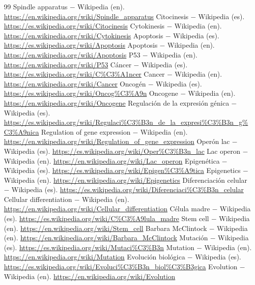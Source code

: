 \documentclass{book}
\begin{document}
\begin{thebibliography}{99}
 Spindle apparatus \(-\) Wikipedia (en). \url{https://en.wikipedia.org/wiki/Spindle_apparatus}
 Citocinesis \(-\) Wikipedia (es). \url{https://es.wikipedia.org/wiki/Citocinesis}
 Cytokinesis \(-\) Wikipedia (en). \url{https://en.wikipedia.org/wiki/Cytokinesis}
 Apoptosis \(-\) Wikipedia (es). \url{https://es.wikipedia.org/wiki/Apoptosis}
 Apoptosis \(-\) Wikipedia (en). \url{https://en.wikipedia.org/wiki/Apoptosis}
 P53 \(-\) Wikipedia (en). \url{https://en.wikipedia.org/wiki/P53}
 Cáncer \(-\) Wikipedia (es). \url{https://es.wikipedia.org/wiki/C%C3%A1ncer}
 Cancer \(-\) Wikipedia (en). \url{https://en.wikipedia.org/wiki/Cancer}
 Oncogén \(-\) Wikipedia (es). \url{https://es.wikipedia.org/wiki/Oncog%C3%A9n}
 Oncogene \(-\) Wikipedia (en). \url{https://en.wikipedia.org/wiki/Oncogene}
 Regulación de la expresión génica \(-\) Wikipedia (es). \url{https://es.wikipedia.org/wiki/Regulaci%C3%B3n_de_la_expresi%C3%B3n_g%C3%A9nica}
 Regulation of gene expression \(-\) Wikipedia (en). \url{https://en.wikipedia.org/wiki/Regulation_of_gene_expression}
 Operón lac \(-\) Wikipedia (es). \url{https://es.wikipedia.org/wiki/Oper%C3%B3n_lac}
 Lac operon \(-\) Wikipedia (en). \url{https://en.wikipedia.org/wiki/Lac_operon}
 Epigenética \(-\) Wikipedia (es). \url{https://es.wikipedia.org/wiki/Epigen%C3%A9tica}
 Epigenetics \(-\) Wikipedia (en). \url{https://en.wikipedia.org/wiki/Epigenetics}
 Diferenciación celular \(-\) Wikipedia (es). \url{https://es.wikipedia.org/wiki/Diferenciaci%C3%B3n_celular}
 Cellular differentiation \(-\) Wikipedia (en). \url{https://en.wikipedia.org/wiki/Cellular_differentiation}
 Célula madre \(-\) Wikipedia (es). \url{https://es.wikipedia.org/wiki/C%C3%A9lula_madre}
 Stem cell \(-\) Wikipedia (en). \url{https://en.wikipedia.org/wiki/Stem_cell}
 Barbara McClintock \(-\) Wikipedia (en). \url{https://en.wikipedia.org/wiki/Barbara_McClintock}
 Mutación \(-\) Wikipedia (es). \url{https://es.wikipedia.org/wiki/Mutaci%C3%B3n}
 Mutation \(-\) Wikipedia (en). \url{https://en.wikipedia.org/wiki/Mutation}
 Evolución biológica \(-\) Wikipedia (es). \url{https://es.wikipedia.org/wiki/Evoluci%C3%B3n_biol%C3%B3gica}
 Evolution \(-\) Wikipedia (en). \url{https://en.wikipedia.org/wiki/Evolution}

\end{thebibliography}
\end{document}
